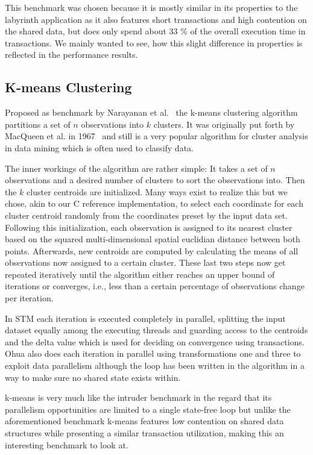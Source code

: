 This benchmark was chosen because it is mostly similar in its properties to the labyrinth application as it also features short transactions and high contention on the shared data, but does only spend about 33 \% of the overall execution time in transactions.
We mainly wanted to see, how this slight difference in properties is reflected in the performance results.


\subsection{K-means Clustering}
\label{sec:experiments:kmeans}

Proposed as benchmark by Narayanan et al.~\cite{narayanan2006minebench} the k-means clustering algorithm partitions a set of $n$ observations into $k$ clusters.
It was originally put forth by MacQueen et al. in 1967~\cite{macqueen1967some} and still is a very popular algorithm for cluster analysis in data mining which is often used to classify data.

The inner workings of the algorithm are rather simple: It takes a set of $n$ observations and a desired number of clusters to sort the observations into.
Then the $k$ cluster centroids are initialized.
Many ways exist to realize this but we chose, akin to our C reference implementation, to select each coordinate for each cluster centroid randomly from the coordinates preset by the input data set.
Following this initialization, each observation is assigned to its nearest cluster based on the squared multi-dimensional spatial euclidian distance between both points.
Afterwards, new centroids are computed by calculating the means of all observations now assigned to a certain cluster.
These last two steps now get repeated iteratively until the algorithm either reaches an upper bound of iterations or converges, i.e., less than a certain percentage of observations change per iteration.

In STM each iteration is executed completely in parallel, splitting the input dataset equally among the executing threads and guarding access to the centroids and the delta value which is used for deciding on convergence using transactions.
Ohua also does each iteration in parallel using transformations one and three to exploit data parallelism although the loop has been written in the algorithm in a way to make sure no shared state exists within.

k-means is very much like the intruder benchmark in the regard that its parallelism opportunities are limited to a single state-free loop but unlike the aforementioned benchmark k-means features low contention on shared data structures while presenting a similar transaction utilization, making this an interesting benchmark to look at.

